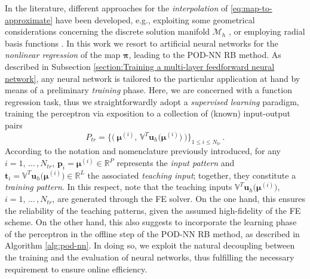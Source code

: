 \documentclass[longtitle]{elsarticle}
\numberwithin{equation}{section}
\theoremstyle{theorem}
\theoremstyle{definition}
\theoremstyle{remark}
\theoremstyle{proposition}
\numberwithin{figure}{section}
\newcommand{\bg}[1]{\boldsymbol{#1}}
\begin{document}
		In the literature, different approaches for the \emph{interpolation} of \eqref{eq:map-to-approximate} have been developed, e.g., exploiting some geometrical considerations concerning the discrete solution manifold $\mathcal{M}_h$ \cite{Ams10}, or employing radial basis functions \cite{Chen17}. In this work we resort to artificial neural networks for the \emph{nonlinear regression} of the map $\bg{\pi}$, leading to the POD-NN RB method. As described in Subsection \ref{section:Training a multi-layer feedforward neural network}, any neural network is tailored to the particular application at hand by means of a preliminary \emph{training} phase. Here, we are concerned with a function regression task, thus we straightforwardly adopt a \emph{supervised learning} paradigm, training the perceptron via exposition to a collection of (known) input-output pairs
		\begin{equation*}
			P_{tr} = \big\lbrace \big( ~ \bg{\mu}^{(i)}, \, \mathbb{V}^T \mathbf{u}_h \big( \bg{\mu}^{(i)} \big) ~ \big) \big\rbrace_{1 \leq i \leq N_{tr}} \, .
		\end{equation*} 
		According to the notation and nomenclature previously introduced, for any $i = 1, \, \ldots \, , N_{tr}$, $\mathbf{p}_i = \bg{\mu}^{(i)} \in \mathbb{R}^P$ represents the \emph{input pattern} and $\mathbf{t}_i =  \mathbb{V}^T \mathbf{u}_h \big( \bg{\mu}^{(i)} \big) \in \mathbb{R}^L$ the associated \emph{teaching input}; together, they constitute a \emph{training pattern}. In this respect, note that the teaching inputs $\mathbb{V}^T \mathbf{u}_h \big( \bg{\mu}^{(i)} \big)$, $i = 1, \, \ldots \, , N_{tr}$, are generated through the FE solver. On the one hand, this ensures the reliability of the teaching patterns, given the assumed high-fidelity of the FE scheme.	On the other hand, this also suggests to incorporate the learning phase of the perceptron in the offline step of the POD-NN RB method, as described in Algorithm \ref{alg:pod-nn}. In doing so, we exploit the natural decoupling between the training and the evaluation of neural networks, thus fulfilling the necessary requirement to ensure online efficiency. 						

		\algrenewcommand\textproc{}
		
\end{document}
